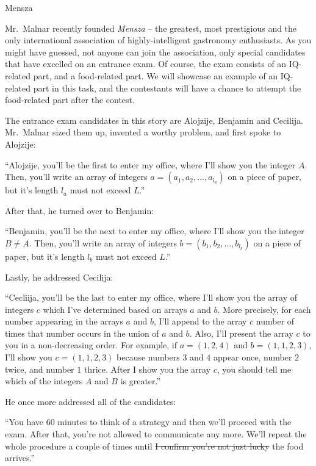 \begin{statement}[
  problempoints=100,
  timelimit=5 seconds,
  memorylimit=512 MiB,
]{Mensza}

Mr.\ Malnar recently founded \textit{Mensza} -- the greatest, most prestigious
and the only international association of highly-intelligent gastronomy
enthusiasts. As you might have guessed, not anyone can join the association,
only special candidates that have excelled on an entrance exam.  Of course,
the exam consists of an IQ-related part, and a food-related part.  We will
showcase an example of an IQ-related part in this task, and the contestants
will have a chance to attempt the food-related part after the contest.

The entrance exam candidates in this story are Alojzije, Benjamin and Cecilija.
Mr.\ Malnar sized them up, invented a worthy problem, and first spoke to Alojzije:

``Alojzije, you'll be the first to enter my office, where I'll show you the
  integer $A$. Then, you'll write an array of integers $a = (a_1, a_2,
\ldots, a_{l_a})$ on a piece of paper, but it's length $l_a$ must not exceed
$L$.''

After that, he turned over to Benjamin:

``Benjamin, you'll be the next to enter my office, where I'll show you the
integer $B \ne A$. Then, you'll write an array of integers $b = (b_1, b_2,
\ldots, b_{l_b})$ on a piece of paper, but it's length $l_b$ must not exceed
$L$.''

Lastly, he addressed Cecilija:

``Cecliija, you'll be the last to enter my office, where I'll show you the
array of integers $c$ which I've determined based on arrays $a$ and $b$. More
precisely, for each number appearing in the arrays $a$ and $b$, I'll append
to the array $c$ number of times that number occurs in the union of $a$ and
$b$. Also, I'll present the array $c$ to you in a non-decreasing order. For
example, if $a = (1, 2, 4)$ and $b = (1, 1, 2, 3)$, I'll show you
$c = (1, 1, 2, 3)$ because numbers $3$ and $4$ appear once, number $2$ twice,
and number $1$ thrice. After I show you the array $c$, you should tell me which
of the integers $A$ and $B$ is greater.''

He once more addressed all of the candidates:

``You have 60 minutes to think of a strategy and then we'll proceed with the
exam. After that, you're not allowed to communicate any more. We'll repeat the
whole procedure a couple of times until \sout{I confirm you're not just lucky}
the food arrives.''


\end{statement}
